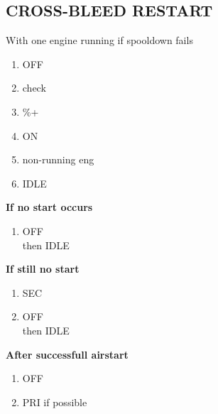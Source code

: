 \documentclass[8pt,usenames,dvipsnames,twoside]{article}
\begin{document}
\begin{multicols*}{2}
		\subsection{CROSS-BLEED RESTART}
		With one engine running if spooldown fails
		\begin{enumerate}
			\item {} \dotfill OFF
			\item {} \dotfill check
			\item {} \%+
			\item {} \dotfill ON
			\item {} \dotfill non-running eng
			\item {} \dotfill IDLE
		\end{enumerate}
		\textbf{If no start occurs}
		\begin{enumerate}[resume]
			\item {} \dotfill OFF\\
			\hfill then IDLE
		\end{enumerate}
		\textbf{If still no start}
		\begin{enumerate}[resume]
			\item {} \dotfill SEC
			\item {} \dotfill OFF\\
			\hfill then IDLE
		\end{enumerate}
		\textbf{After successfull airstart}
		\begin{enumerate}[resume]
			\item {} \dotfill OFF
			\item {} \dotfill PRI if possible
		\end{enumerate}
	

\end{multicols*}
\end{document}
